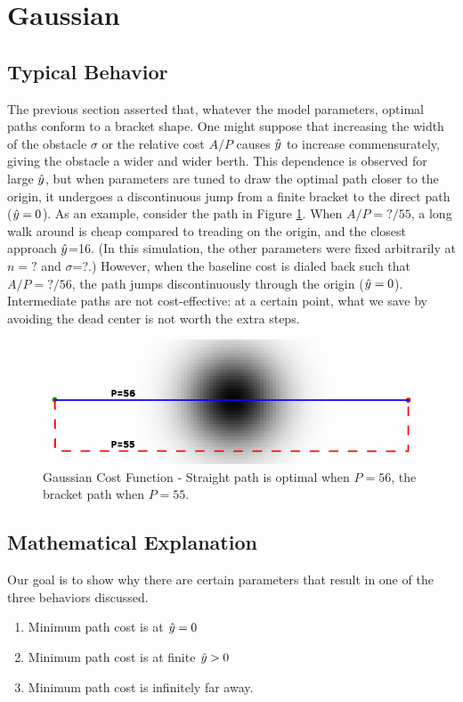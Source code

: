 \section{Gaussian}

\subsection{Typical Behavior}

The previous section asserted that, whatever the model parameters, optimal paths conform to a bracket shape. One might suppose that increasing the width of the obstacle $\sigma$ or the relative cost $A/P$ causes $\hat{y}$ to increase commensurately, giving the obstacle a wider and wider berth. This dependence is observed for large $\hat{y}$, but when parameters are tuned to draw the optimal path closer to the origin, it undergoes a discontinuous jump from a finite bracket to the direct path ($\hat{y}=0$). As an example, consider the path in Figure \ref{fig:gaussian}. When $A/P=?/55$, a long walk around is cheap compared to treading on the origin, and the closest approach $\hat{y}$=16. (In this simulation, the other parameters were fixed arbitrarily at $n=?$ and $\sigma$=?.) However, when the baseline cost is dialed back such that $A/P=?/56$, the path jumps discontinuously through the origin ($\hat{y}=0$). Intermediate paths are not cost-effective: at a certain point, what we save by avoiding the dead center is not worth the extra steps.

\begin{figure}
\includegraphics[width=\columnwidth]{graphix/Gaussian.png}
\caption{Gaussian Cost Function - Straight path is optimal when $P=56$, the bracket path when $P=55$. }
\label{fig:gaussian}
\end{figure}

\subsection{Mathematical Explanation}
Our goal is to show why there are certain parameters that result in one of the three behaviors discussed. 
\begin{enumerate}
\item Minimum path cost is at $\hat{y}=0$
\item Minimum path cost is at finite $\hat{y}>0$
\item Minimum path cost is infinitely far away. 
\end{enumerate}

